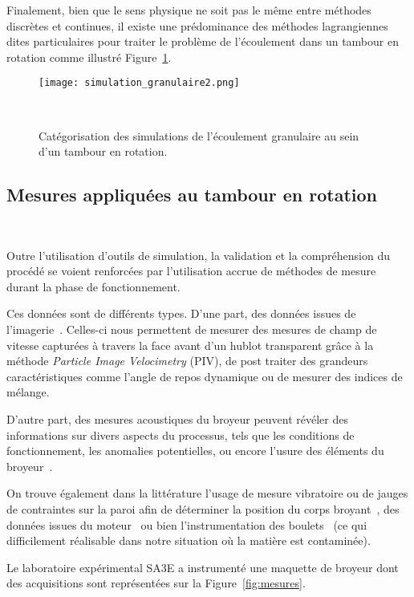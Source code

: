 Finalement, bien que le sens physique ne soit pas le même entre méthodes discrètes et continues, il existe une prédominance des méthodes lagrangiennes dites particulaires pour traiter le problème de l'écoulement dans un tambour en rotation comme illustré Figure~\ref{fig:simu_granulaire}.

\begin{figure}[h]
    \centering
    \texttt{[image: simulation\_granulaire2.png]}
    \caption{Catégorisation des simulations de l'écoulement granulaire au sein d'un tambour en rotation.}~\label{fig:simu_granulaire}
\end{figure}

\subsection*{Mesures appliquées au tambour en rotation}~\label{sec:mesures}

Outre l'utilisation d'outils de simulation, la validation et la compréhension du procédé se voient renforcées par l'utilisation accrue de méthodes de mesure durant la phase de fonctionnement.

Ces données sont de différents types. D'une part, des données issues de l'imagerie~\cite{jarray_wet_2019,Adepu}. Celles-ci nous permettent de mesurer des mesures de champ de vitesse capturées à travers la face avant d'un hublot transparent grâce à la méthode \textit{Particle Image Velocimetry} (PIV), de post traiter des grandeurs caractéristiques comme l'angle de repos dynamique ou de mesurer des indices de mélange.

D'autre part, des mesures acoustiques du broyeur peuvent révéler des informations sur divers aspects du processus, tels que les conditions de fonctionnement, les anomalies potentielles, ou encore l'usure des éléments du broyeur~\cite{Owusu, almond}.

On trouve également dans la littérature l'usage de mesure vibratoire ou de jauges de contraintes sur la paroi afin de déterminer la position du corps broyant~\cite{Davey, tano_2005}, des données issues du moteur~\cite{pedrayes_frequency_2017} ou bien l'instrumentation des boulets~\cite{Wang} (ce qui difficilement réalisable dans notre situation où la matière est contaminée).

Le laboratoire expérimental SA3E a instrumenté une maquette de broyeur dont des acquisitions sont représentées sur la Figure~\ref{fig:mesures}.

